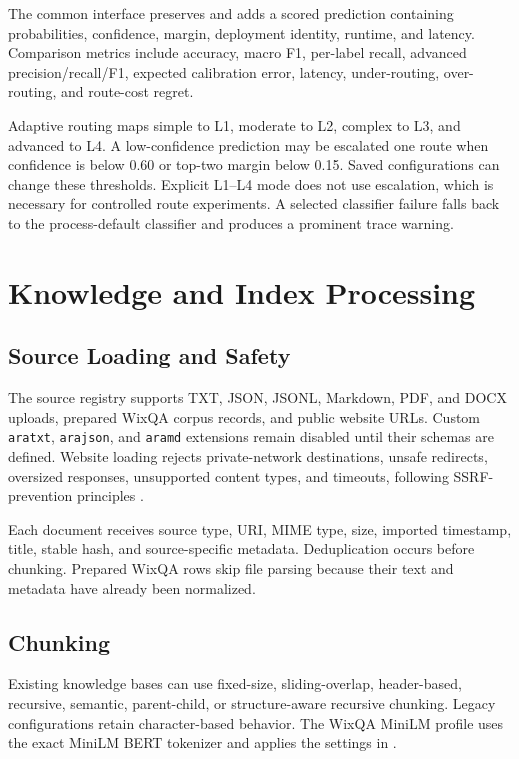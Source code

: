 The common interface preserves  and adds a scored
prediction containing probabilities, confidence, margin, deployment identity,
runtime, and latency. Comparison metrics include accuracy, macro F1,
per-label recall, advanced precision/recall/F1, expected calibration error,
latency, under-routing, over-routing, and route-cost regret.

Adaptive routing maps simple to L1, moderate to L2, complex to L3, and advanced
to L4. A low-confidence prediction may be escalated one route when confidence
is below 0.60 or top-two margin below 0.15. Saved configurations can change
these thresholds. Explicit L1--L4 mode does not use escalation, which is
necessary for controlled route experiments. A selected classifier failure
falls back to the process-default classifier and produces a prominent trace
warning.



\section{Knowledge and Index Processing}

\subsection{Source Loading and Safety}

The source registry supports TXT, JSON, JSONL, Markdown, PDF, and DOCX uploads,
prepared WixQA corpus records, and public website URLs. Custom \texttt{aratxt},
\texttt{arajson}, and \texttt{aramd} extensions remain disabled until their
schemas are defined. Website loading rejects private-network destinations,
unsafe redirects, oversized responses, unsupported content types, and
timeouts, following SSRF-prevention principles \cite{owaspssrf2026}.

Each document receives source type, URI, MIME type, size, imported timestamp,
title, stable hash, and source-specific metadata. Deduplication occurs before
chunking. Prepared WixQA rows skip file parsing because their text and metadata
have already been normalized.

\subsection{Chunking}

Existing knowledge bases can use fixed-size, sliding-overlap, header-based,
recursive, semantic, parent-child, or structure-aware recursive chunking.
Legacy configurations retain character-based behavior. The WixQA MiniLM
profile uses the exact MiniLM BERT tokenizer and applies the settings in
.

